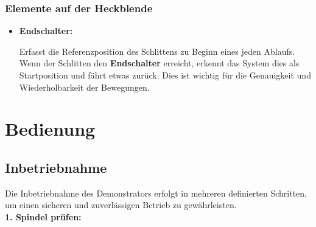 \documentclass[a4paper,12pt,final]{report}
\begin{document}
	\subsection{Elemente auf der Heckblende}
	\begin{itemize}[leftmargin=1.5em]
		
		\item \textbf{Endschalter:}
		
		Erfasst die Referenzposition des Schlittens zu Beginn eines jeden Ablaufs. Wenn der Schlitten den \textbf{Endschalter} erreicht, erkennt das System dies als Startposition und fährt etwas zurück. Dies ist wichtig für die Genauigkeit und Wiederholbarkeit der Bewegungen.\\
		
	\end{itemize}
	
	
	\chapter{Bedienung}
	\section{Inbetriebnahme}

		Die Inbetriebnahme des Demonstrators erfolgt in mehreren definierten Schritten, um einen sicheren und zuverlässigen Betrieb zu gewährleisten. \\[0,75cm]
		
		\noindent\textbf{1. Spindel prüfen:}
		
\end{document}
